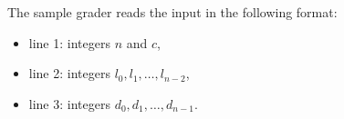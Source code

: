 The sample grader reads the input in the following format:

\begin{itemize}
\item line 1: integers $n$ and $c$,
\item line 2: integers $l_0, l_1, \ldots, l_{n - 2}$,
\item line 3: integers $d_0, d_1, \ldots, d_{n - 1}$.
\end{itemize}